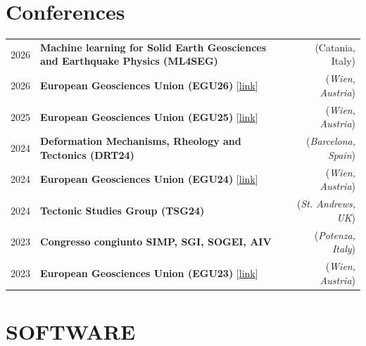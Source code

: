 \documentclass[a4paper,12pt]{article}
\begin{document}
\section{Conferences}
\begin{tabularx}{\linewidth}{@{}l X r}	

2026 & \textbf{Machine learning for Solid Earth Geosciences and Earthquake Physics (ML4SEG)} & (Catania, Italy)\\
 
2026 & \textbf{European Geosciences Union (EGU26)} [\href{https://meetingorganizer.copernicus.org/EGU26/EGU26-9901.html}{link}] & (\textit{Wien, Austria})\\

2025 & \textbf{European Geosciences Union (EGU25)} [\href{https://meetingorganizer.copernicus.org/EGU25/EGU25-13050.html}{link}] & (\textit{Wien, Austria})\\

2024 & \textbf{Deformation Mechanisms, Rheology and Tectonics (DRT24)} & (\textit{Barcelona, Spain})\\

2024 & \textbf{European Geosciences Union (EGU24)} [\href{https://meetingorganizer.copernicus.org/EGU24/EGU24-22156.html}{link}] & (\textit{Wien, Austria})\\

2024 & \textbf{Tectonic Studies Group (TSG24)} & (\textit{St. Andrews, UK})\\

2023 & \textbf{Congresso congiunto SIMP, SGI, SOGEI, AIV} & (\textit{Potenza, Italy})\\

2023 & \textbf{European Geosciences Union (EGU23)} [\href{https://meetingorganizer.copernicus.org/EGU23/EGU23-9549.html}{link}] & (\textit{Wien, Austria})\\

\end{tabularx}

\section{SOFTWARE}
\end{document}
